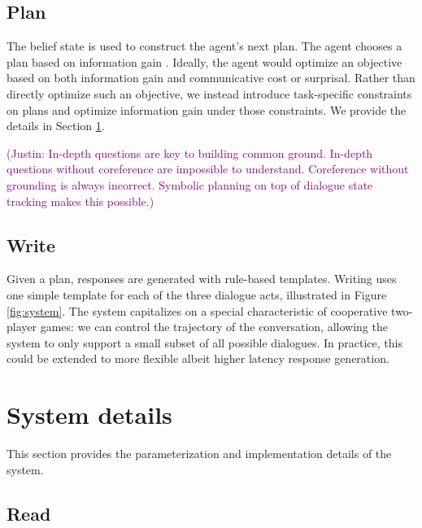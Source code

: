 \documentclass[11pt]{article}
\newcommand{\justin}[1]{{{\textcolor{purple}{(Justin: #1)}}}}
\begin{document}
\subsection{Plan}
The belief state is used to construct the agent's next plan.
The agent chooses a plan based on information gain \citep{lindley}.
Ideally, the agent would optimize an objective based on both information gain and communicative cost or surprisal.
Rather than directly optimize such an objective,
we instead introduce task-specific constraints on plans and optimize information gain under those constraints.
We provide the details in Section \ref{sec:implementation}.

\justin{In-depth questions are key to building common ground.
In-depth questions without coreference are impossible to understand.
Coreference without grounding is always incorrect.
Symbolic planning on top of dialogue state tracking makes this possible.}

\subsection{Write}
Given a plan, responses are generated with rule-based templates.
Writing uses one simple template for each of the three dialogue acts,
illustrated in Figure \ref{fig:system}.
The system capitalizes on a special characteristic of cooperative two-player games: 
we can control the trajectory of the conversation,
allowing the system to only support a small subset of all possible dialogues.
In practice, this could be extended to more flexible albeit higher latency response generation.


\section{System details}
\label{sec:implementation}
This section provides the parameterization and implementation details of the system.

\subsection{Read}
\label{sec:read}
\end{document}
